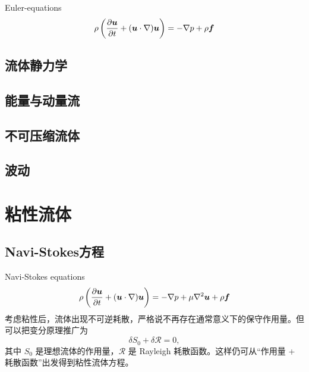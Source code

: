 \documentclass[b5paper]{book}
\begin{document}
Euler-equations
\begin{equation}
    \rho \left( \frac{\partial\boldsymbol{u}}{\partial t}+ (\boldsymbol{u}\cdot\nabla)\boldsymbol{u} \right) = -\nabla p + \rho\boldsymbol{f}
\end{equation}

\section{流体静力学}
\label{sec:hydrostatics}

\section{能量与动量流}
\label{sec:flux}

\section{不可压缩流体}
\label{sec:incompressible}
\section{波动}
\label{sec:waves}


\chapter{粘性流体}
\section{Navi-Stokes方程}
Navi-Stokes equations
\begin{equation}
    \rho \left( \frac{\partial\boldsymbol{u}}{\partial t}+ (\boldsymbol{u}\cdot\nabla)\boldsymbol{u} \right) = -\nabla p + \mu\nabla^2 \boldsymbol{u}+ \rho\boldsymbol{f}
\end{equation}
考虑粘性后，流体出现不可逆耗散，严格说不再存在通常意义下的保守作用量。但可以把变分原理推广为  
\[
\delta S_0+\delta \mathcal R=0,
\]
其中 \(S_0\) 是理想流体的作用量，\(\mathcal R\) 是 Rayleigh 耗散函数。这样仍可从“作用量 + 耗散函数”出发得到粘性流体方程。
\end{document}
